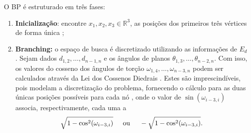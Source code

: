 \documentclass[11pt]{article}
\begin{document}
{{O BP é estruturado em três fases: \vspace{-0.2cm}
\begin{enumerate}[(1)]
\item {\bf Inicialização}: encontre $x_{1},x_{2},x_{3} \in \mathbb{R}^{3}$, as posições dos primeiros três vértices de forma única \cite{LavorCOAP:12};

\item {\bf Branching:} o espaço de busca é discretizado utilizando as informações de $E_{d}$. Sejam dados $d_{1,2},\hdots,d_{n-1,n}$ e os ângulos de planos $\theta_{1,3},\hdots,\theta_{n-2,n}$. Com isso, os valores do cosseno dos ângulos de torção $\omega_{1,4},\hdots,\omega_{n-3,n}$ podem ser calculados através da Lei dos Cossenos Diedrais \cite{Pogorelov:87,LavorCOAP:12}. Estes são imprescindíveis, pois modelam a discretização do problema, fornecendo o cálculo para as duas únicas posições possíveis para cada nó \cite{Survey:12}, onde o valor de $\sin(\omega_{i-3,i})$ associa, respectivamente, cada uma a
\begin{equation*}
\sqrt{1 - \cos^{2}(\omega_{i-3,i})} \hspace{0.5cm} \mbox{ou} \hspace{0.5cm} -\sqrt{1 - \cos^{2}(\omega_{i-3,i})}.
\end{equation*}


\end{enumerate}}}
\end{document}
